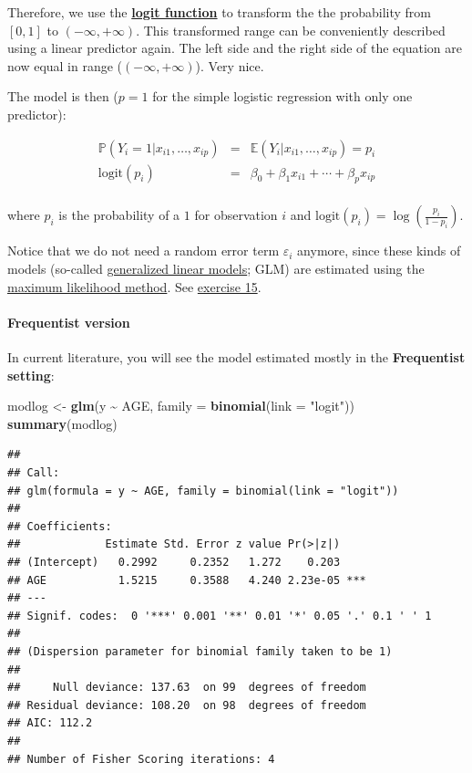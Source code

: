 \documentclass[
]{article}
\newenvironment{Shaded}{\begin{snugshade}}{\end{snugshade}}
\newcommand{\AttributeTok}[1]{\textcolor[rgb]{0.13,0.29,0.53}{#1}}
\newcommand{\FunctionTok}[1]{\textcolor[rgb]{0.13,0.29,0.53}{\textbf{#1}}}
\newcommand{\NormalTok}[1]{#1}
\newcommand{\OtherTok}[1]{\textcolor[rgb]{0.56,0.35,0.01}{#1}}
\newcommand{\SpecialCharTok}[1]{\textcolor[rgb]{0.81,0.36,0.00}{\textbf{#1}}}
\newcommand{\StringTok}[1]{\textcolor[rgb]{0.31,0.60,0.02}{#1}}
\begin{document}
Therefore, we use the
\href{https://en.wikipedia.org/wiki/Logit}{\textbf{logit function}} to
transform the the probability from \([0,1]\) to \((-\infty, +\infty)\).
This transformed range can be conveniently described using a linear
predictor again. The left side and the right side of the equation are
now equal in range (\((-\infty, +\infty)\)). Very nice.

The model is then (\(p=1\) for the simple logistic regression with only
one predictor):

\[
\begin{array}{rcl}
\mathbb{P}(Y_i = 1 | x_{i1}, \ldots, x_{ip}) &=& \mathbb{E}(Y_i | x_{i1}, \ldots, x_{ip}) = p_i \\
\text{logit}(p_i) &=& \beta_0 + \beta_1 x_{i1} + \cdots + \beta_p x_{ip} \\
\end{array}
\]

where \(p_i\) is the probability of a \(1\) for observation \(i\) and
\(\text{logit}(p_i) = \log\left(\frac{p_i}{1 - p_i}\right)\).

Notice that we do not need a random error term \(\varepsilon_i\)
anymore, since these kinds of models (so-called
\href{https://en.wikipedia.org/wiki/Generalized_linear_model}{generalized
linear models}; GLM) are estimated using the
\href{https://en.wikipedia.org/wiki/Maximum_likelihood_estimation}{maximum
likelihood method}. See \hyperref[exercise15_LMM]{exercise 15}.

\paragraph{Frequentist version}\label{frequentist_logistic}

In current literature, you will see the model estimated mostly in the
\textbf{Frequentist setting}:

\begin{Shaded}
\begin{Highlighting}[]
\NormalTok{modlog }\OtherTok{\textless{}{-}} \FunctionTok{glm}\NormalTok{(y }\SpecialCharTok{\textasciitilde{}}\NormalTok{ AGE, }\AttributeTok{family =} \FunctionTok{binomial}\NormalTok{(}\AttributeTok{link =} \StringTok{"logit"}\NormalTok{))}
\FunctionTok{summary}\NormalTok{(modlog)}
\end{Highlighting}
\end{Shaded}

\begin{verbatim}
## 
## Call:
## glm(formula = y ~ AGE, family = binomial(link = "logit"))
## 
## Coefficients:
##             Estimate Std. Error z value Pr(>|z|)    
## (Intercept)   0.2992     0.2352   1.272    0.203    
## AGE           1.5215     0.3588   4.240 2.23e-05 ***
## ---
## Signif. codes:  0 '***' 0.001 '**' 0.01 '*' 0.05 '.' 0.1 ' ' 1
## 
## (Dispersion parameter for binomial family taken to be 1)
## 
##     Null deviance: 137.63  on 99  degrees of freedom
## Residual deviance: 108.20  on 98  degrees of freedom
## AIC: 112.2
## 
## Number of Fisher Scoring iterations: 4
\end{verbatim}
\end{document}
